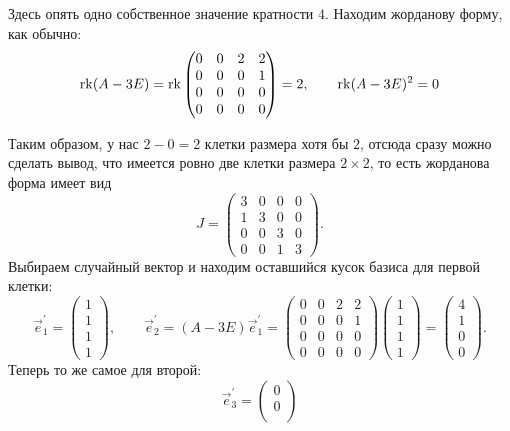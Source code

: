 \begin{solution}
	Здесь опять одно собственное значение кратности $4$. Находим жорданову форму, как обычно:
	\begin{gather*}
		\operatorname{rk}(A - 3E) = \operatorname{rk}
		\begin{pmatrix}
			0 & 0 & 2 & 2\\
			0 & 0 & 0 & 1\\
			0 & 0 & 0 & 0\\
			0 & 0 & 0 & 0
		\end{pmatrix} = 2,\qquad \operatorname{rk}(A - 3E)^2 = 0
	\end{gather*}

	Таким образом, у нас $2 - 0 = 2$ клетки размера хотя бы $2$, отсюда сразу можно сделать вывод, что имеется ровно две клетки размера $2 \times 2$, то есть жорданова форма имеет вид
	\[
		J =
		\begin{pmatrix}
			3 & 0 & 0 & 0\\
			1 & 3 & 0 & 0\\
			0 & 0 & 3 & 0\\
			0 & 0 & 1 & 3
		\end{pmatrix}.
	\]
	Выбираем случайный вектор и находим оставшийся кусок базиса для первой клетки:
	\[
		\vec{e}^\prime_1 =
		\begin{pmatrix}
			1\\
			1\\
			1\\
			1
		\end{pmatrix},\qquad
		\vec{e}^\prime_2 = (A - 3E)\vec{e}^\prime_1 =
		\begin{pmatrix}
			0 & 0 & 2 & 2\\
			0 & 0 & 0 & 1\\
			0 & 0 & 0 & 0\\
			0 & 0 & 0 & 0
		\end{pmatrix}
		\begin{pmatrix}
			1\\
			1\\
			1\\
			1
		\end{pmatrix} =
		\begin{pmatrix}
			4\\
			1\\
			0\\
			0
		\end{pmatrix}.
	\]
	Теперь то же самое для второй:
	\[
		\vec{e}^\prime_3 =
		\begin{pmatrix}
			0\\
			0\\

\end{pmatrix}\]
\end{solution}
